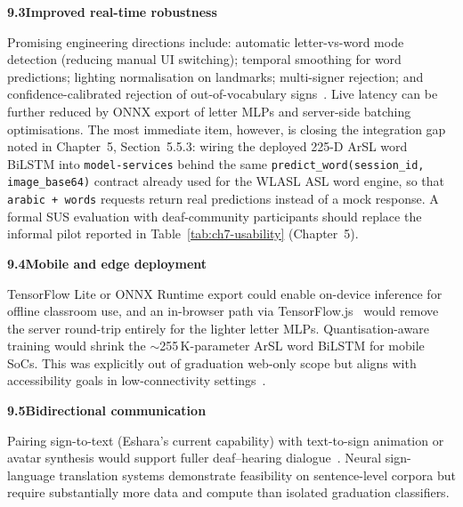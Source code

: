 \noindent\textbf{9.3\quad Improved real-time robustness}\par
{}
\vspace{0.2cm}

\noindent Promising engineering directions include: automatic letter-vs-word mode detection (reducing manual UI switching); temporal smoothing for word predictions; lighting normalisation on landmarks; multi-signer rejection; and confidence-calibrated rejection of out-of-vocabulary signs~\cite{zhang2020mediapipe,deng2024skeleton}. Live latency can be further reduced by ONNX export of letter MLPs and server-side batching optimisations. The most immediate item, however, is closing the integration gap noted in Chapter~5, Section~5.5.3: wiring the deployed 225-D ArSL word BiLSTM into \texttt{model-services} behind the same \texttt{predict\_word(session\_id, image\_base64)} contract already used for the WLASL ASL word engine, so that \texttt{arabic + words} requests return real predictions instead of a mock response. A formal SUS evaluation with deaf-community participants should replace the informal pilot reported in Table~\ref{tab:ch7-usability} (Chapter~5).\par\vspace{0.3cm}

\noindent\textbf{9.4\quad Mobile and edge deployment}\par
{}
\vspace{0.2cm}

\noindent TensorFlow Lite or ONNX Runtime export could enable on-device inference for offline classroom use, and an in-browser path via TensorFlow.js~\cite{tensorflowjs2024} would remove the server round-trip entirely for the lighter letter MLPs. Quantisation-aware training would shrink the $\sim$255\,K-parameter ArSL word BiLSTM for mobile SoCs. This was explicitly out of graduation web-only scope but aligns with accessibility goals in low-connectivity settings~\cite{abadi2016tensorflow,sandler2018mobilenetv2}.\par\vspace{0.3cm}

\noindent\textbf{9.5\quad Bidirectional communication}\par
{}
\vspace{0.2cm}

\noindent Pairing sign-to-text (Eshara's current capability) with text-to-sign animation or avatar synthesis would support fuller deaf--hearing dialogue~\cite{camgoz2018neural}. Neural sign-language translation systems demonstrate feasibility on sentence-level corpora but require substantially more data and compute than isolated graduation classifiers.\par\vspace{0.3cm}

